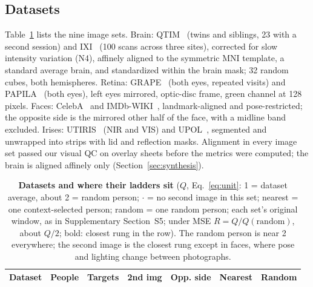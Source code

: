 \subsection{Datasets}
\label{sec:m-brain}
\label{sec:m-fundus}
\label{sec:m-face}
\label{sec:m-iris}
Table~\ref{tab:datasets} lists the nine image sets.
Brain: QTIM~\cite{qtim2026,strike2019} (twins and siblings, 23 with a second session) and IXI~\cite{ixi} (100 scans across three sites), corrected for slow intensity variation (N4), affinely aligned to the symmetric \ac{MNI} template, a standard average brain, and standardized within the brain mask; 32 random cubes, both hemispheres.
Retina: GRAPE~\cite{grape2023} (both eyes, repeated visits) and PAPILA~\cite{papila2022} (both eyes), left eyes mirrored, optic-disc frame, green channel at 128 pixels.
Faces: CelebA~\cite{celeba2015} and IMDb-WIKI~\cite{rothe2018}, landmark-aligned and pose-restricted; the opposite side is the mirrored other half of the face, with a midline band excluded.
Irises: UTIRIS~\cite{hosseini2010} (\ac{NIR} and \ac{VIS}) and UPOL~\cite{dobes2004}, segmented and unwrapped into strips with lid and reflection masks.
Alignment in every image set passed our visual \ac{QC} on overlay sheets before the metrics were computed; the brain is aligned affinely only (Section~\ref{sec:synthesis}).

\begin{table}[t]
\centering
\caption{\textbf{Datasets and where their ladders sit} ($Q$, Eq.~\ref{eq:unit}: 1 = dataset average, about 2 = random person; $\cdot$ = no second image in this set; nearest = one context-selected person; random = one random person; each set's original window, as in Supplementary Section~S5; under \acs{MSE} $R=Q/Q(\mathrm{random})$, about $Q/2$; bold: closest rung in the row).
The random person is near 2 everywhere; the second image is the closest rung except in faces, where pose and lighting change between photographs.}
\label{tab:datasets}
\scriptsize
\setlength{\tabcolsep}{2.2pt}
\begin{tabular}{@{}lrrrrrr@{}}
\toprule
Dataset & People & Targets & 2nd img & Opp. side & Nearest & Random \\
\midrule

\end{tabular}
\end{table}
